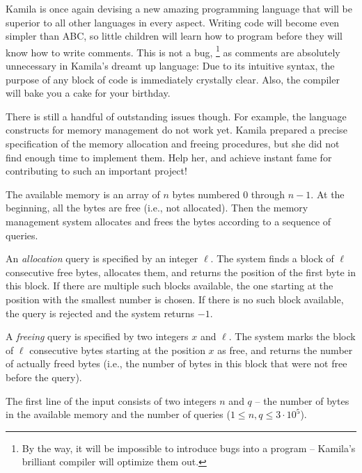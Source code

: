 

Kamila is once again devising a new amazing programming language that will be
superior to all other languages in every aspect. Writing code will become even
simpler than ABC, so little children will learn how to program before they will
know how to write comments. This is not a bug,%
\footnote{By the way, it will be impossible to introduce bugs into a program --
Kamila's brilliant compiler will optimize them out.}
as comments are absolutely unnecessary in Kamila's dreamt up language: Due to
its intuitive syntax, the purpose of any block of code is immediately crystally
clear. Also, the compiler will bake you a cake for your birthday.

There is still a handful of outstanding issues though. For example, the language
constructs for memory management do not work yet. Kamila prepared a precise
specification of the memory allocation and freeing procedures, but she did not
find enough time to implement them. Help her, and achieve instant fame for
contributing to such an important project!



The available memory is an array of $n$ bytes numbered $0$ through $n-1$. At the
beginning, all the bytes are free (i.e., not allocated). Then the memory
management system allocates and frees the bytes according to a sequence of
queries.

An \emph{allocation} query is specified by an integer $\ell$. The system finds a
block of $\ell$ consecutive free bytes, allocates them, and returns the position
of the first byte in this block. If there are multiple such blocks available,
the one starting at the position with the smallest number is chosen. If there is
no such block available, the query is rejected and the system returns $-1$.

A \emph{freeing} query is specified by two integers $x$ and $\ell$. The system
marks the block of $\ell$ consecutive bytes starting at the position $x$ as
free, and returns the number of actually freed bytes (i.e., the number of bytes
in this block that were not free before the query).



The first line of the input consists of two integers $n$ and $q$ -- the number
of bytes in the available memory and the number of queries ($1 \leq n, q \leq
3\cdot 10^5$).

